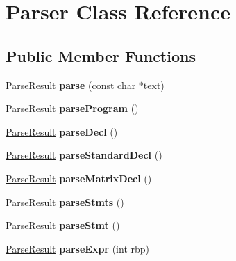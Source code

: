 \hypertarget{classParser}{\section{Parser Class Reference}
\label{classParser}
}
\subsection*{Public Member Functions}
\begin{DoxyCompactItemize}
\item 
\hypertarget{classParser_a2c1a7aa0b09a43bc1eef460817efb1d6}{\hyperlink{classParseResult}{Parse\-Result} {\bfseries parse} (const char $\ast$text)}\label{classParser_a2c1a7aa0b09a43bc1eef460817efb1d6}

\item 
\hypertarget{classParser_a14e25c84322809e2f060dc530362ea71}{\hyperlink{classParseResult}{Parse\-Result} {\bfseries parse\-Program} ()}\label{classParser_a14e25c84322809e2f060dc530362ea71}

\item 
\hypertarget{classParser_ac646227983887c1cd13dae67fa1bc142}{\hyperlink{classParseResult}{Parse\-Result} {\bfseries parse\-Decl} ()}\label{classParser_ac646227983887c1cd13dae67fa1bc142}

\item 
\hypertarget{classParser_a1e1f83c0f4b11148a356d951f191425e}{\hyperlink{classParseResult}{Parse\-Result} {\bfseries parse\-Standard\-Decl} ()}\label{classParser_a1e1f83c0f4b11148a356d951f191425e}

\item 
\hypertarget{classParser_a3a00df25fda2af308b69f05eed14ac69}{\hyperlink{classParseResult}{Parse\-Result} {\bfseries parse\-Matrix\-Decl} ()}\label{classParser_a3a00df25fda2af308b69f05eed14ac69}

\item 
\hypertarget{classParser_a452db3def31683cb0305e57a01489bd4}{\hyperlink{classParseResult}{Parse\-Result} {\bfseries parse\-Stmts} ()}\label{classParser_a452db3def31683cb0305e57a01489bd4}

\item 
\hypertarget{classParser_a9709c4793d0cce012d595f3ee416cd25}{\hyperlink{classParseResult}{Parse\-Result} {\bfseries parse\-Stmt} ()}\label{classParser_a9709c4793d0cce012d595f3ee416cd25}

\item 
\hypertarget{classParser_a50227dc24dc7a175ac0533d9957dfcf8}{\hyperlink{classParseResult}{Parse\-Result} {\bfseries parse\-Expr} (int rbp)}\label{classParser_a50227dc24dc7a175ac0533d9957dfcf8}


\end{DoxyCompactItemize}
